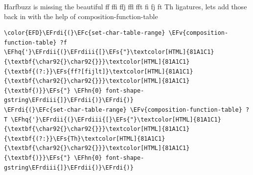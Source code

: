 \documentclass{scrartcl}
\newcommand{\EFs}[1]{\textcolor{EFs}{#1}} %
\newcommand{\EFc}[1]{\textcolor{EFc}{#1}} %
\newcommand{\EFv}[1]{\textcolor{EFv}{#1}} %
\newcommand{\EFhn}[1]{#1} %
\newcommand{\EFhq}[1]{#1} %
\newcommand{\EFrdi}[1]{#1} %
\newcommand{\EFrdii}[1]{#1} %
\newcommand{\EFrdiii}[1]{#1} %
\begin{document}
Harfbuzz is missing the beautiful ff ffi ffj ffl fft fi fj ft Th ligatures,
lets add those back in with the help of composition-function-table

\begin{Code}
\begin{Verbatim}[]
\color{EFD}\EFrdi{(}\EFc{set-char-table-range} \EFv{composition-function-table} ?f \EFhq{'}\EFrdii{(}\EFrdiii{[}\EFs{"}\textcolor[HTML]{81A1C1}{\textbf{\char92{}\char92{}}}\textcolor[HTML]{81A1C1}{\textbf{(?:}}\EFs{ff?[fijlt]}\textcolor[HTML]{81A1C1}{\textbf{\char92{}\char92{}}}\textcolor[HTML]{81A1C1}{\textbf{)}}\EFs{"} \EFhn{0} font-shape-gstring\EFrdiii{]}\EFrdii{)}\EFrdi{)}
\EFrdi{(}\EFc{set-char-table-range} \EFv{composition-function-table} ?T \EFhq{'}\EFrdii{(}\EFrdiii{[}\EFs{"}\textcolor[HTML]{81A1C1}{\textbf{\char92{}\char92{}}}\textcolor[HTML]{81A1C1}{\textbf{(?:}}\EFs{Th}\textcolor[HTML]{81A1C1}{\textbf{\char92{}\char92{}}}\textcolor[HTML]{81A1C1}{\textbf{)}}\EFs{"} \EFhn{0} font-shape-gstring\EFrdiii{]}\EFrdii{)}\EFrdi{)}
\end{Verbatim}
\end{Code}
\end{document}
